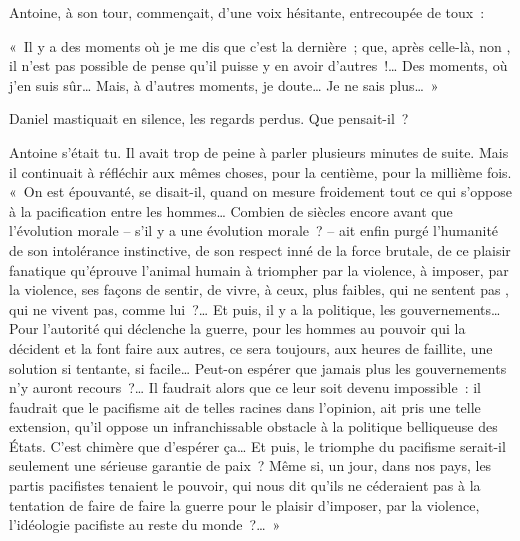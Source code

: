 
{

Antoine, à son tour, commençait, d'une voix hésitante, entrecoupée de
toux~:

«~Il y a des moments où je me dis que c'est la dernière~; que, après
celle-là, non , il n'est pas possible de pense qu'il puisse y en
avoir d'autres~!… Des moments, où j'en suis sûr… Mais, à d'autres
moments, je doute… Je ne sais plus…~»

Daniel mastiquait en silence, les regards perdus. Que pensait-il~?

Antoine s'était tu. Il avait trop de peine à parler plusieurs minutes
de suite. Mais il continuait à réfléchir aux mêmes choses, pour la
centième, pour la millième fois. «~On est épouvanté, se disait-il,
quand on mesure froidement tout ce qui s'oppose à la pacification
entre les hommes… Combien de siècles encore avant que l'évolution
morale – s'il y a une évolution morale~? – ait enfin purgé l'humanité
de son intolérance instinctive, de son respect inné de la force
brutale, de ce plaisir fanatique qu'éprouve l'animal humain à
triompher par la violence, à imposer, par la violence, ses façons de
sentir, de vivre, à ceux, plus faibles, qui ne sentent pas , qui ne
vivent pas, comme lui~?… Et puis, il y a la politique, les
gouvernements… Pour l'autorité qui déclenche la guerre, pour les
hommes au pouvoir qui la décident et la font faire aux autres, ce
sera toujours, aux heures de faillite, une solution si tentante, si
facile… Peut-on espérer que jamais plus les gouvernements n'y auront
recours~?… Il faudrait alors que ce leur soit devenu impossible~: il
faudrait que le pacifisme ait de telles racines dans l'opinion, ait
pris une telle extension, qu'il oppose un infranchissable obstacle à
la politique belliqueuse des États. C'est chimère que d'espérer ça…
Et puis, le triomphe du pacifisme serait-il seulement une sérieuse
garantie de paix~? Même si, un jour, dans nos pays, les partis
pacifistes tenaient le pouvoir, qui nous dit qu'ils ne céderaient pas
à la tentation de faire de faire la guerre pour le plaisir d'imposer,
par la violence, l'idéologie pacifiste au reste du monde~?…~»
}

